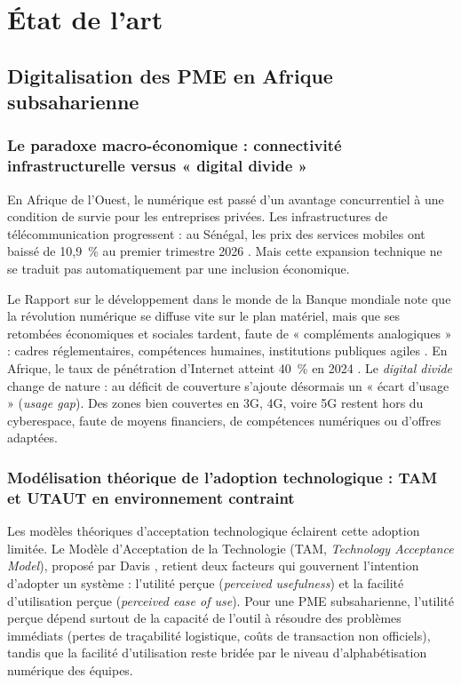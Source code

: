 \chapter{État de l'art}
\label{chap:etat_art}

\section{Digitalisation des PME en Afrique subsaharienne}
\label{sec:Digitalisation_PME_Afrique}

\subsection{Le paradoxe macro-économique : connectivité infrastructurelle versus « digital divide »}

En Afrique de l'Ouest, le numérique est passé d'un avantage concurrentiel à une condition de survie pour les entreprises privées. Les infrastructures de télécommunication progressent : au Sénégal, les prix des services mobiles ont baissé de 10,9~\% au premier trimestre 2026 \cite{artpNOTETRIMESTRIELLELINDICE2026}. Mais cette expansion technique ne se traduit pas automatiquement par une inclusion économique. 

Le Rapport sur le développement dans le monde de la Banque mondiale note que la révolution numérique se diffuse vite sur le plan matériel, mais que ses retombées économiques et sociales tardent, faute de « compléments analogiques » : cadres réglementaires, compétences humaines, institutions publiques agiles \cite{worldbankgroupWorldDevelopmentReport2016}. En Afrique, le taux de pénétration d'Internet atteint 40~\% en 2024 \cite{AccelererRevolutionNumerique}. Le \textit{digital divide} change de nature : au déficit de couverture s'ajoute désormais un « écart d'usage » (\textit{usage gap}). Des zones bien couvertes en 3G, 4G, voire 5G restent hors du cyberespace, faute de moyens financiers, de compétences numériques ou d'offres adaptées.

\subsection{Modélisation théorique de l'adoption technologique : TAM et UTAUT en environnement contraint}

Les modèles théoriques d'acceptation technologique éclairent cette adoption limitée. Le Modèle d'Acceptation de la Technologie (TAM, \textit{Technology Acceptance Model}), proposé par Davis \cite{davisTechnologyAcceptanceModel1989}, retient deux facteurs qui gouvernent l'intention d'adopter un système : l'utilité perçue (\textit{perceived usefulness}) et la facilité d'utilisation perçue (\textit{perceived ease of use}). Pour une PME subsaharienne, l'utilité perçue dépend surtout de la capacité de l'outil à résoudre des problèmes immédiats (pertes de traçabilité logistique, coûts de transaction non officiels), tandis que la facilité d'utilisation reste bridée par le niveau d'alphabétisation numérique des équipes.

